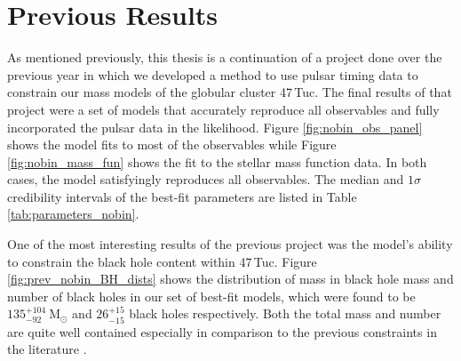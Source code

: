 


\section{Previous Results}

As mentioned previously, this thesis is a continuation of a project done over the previous year in
which we developed a method to use pulsar timing data to constrain our mass models of the globular
cluster 47\,Tuc. The final results of that project were a set of models that accurately reproduce
all observables and fully incorporated the pulsar data in the likelihood. Figure
\ref{fig:nobin_obs_panel} shows the model fits to most of the observables while Figure
\ref{fig:nobin_mass_fun} shows the fit to the stellar mass function data. In both cases, the model
satisfyingly reproduces all observables. The median and $1\sigma$ credibility intervals of the
best-fit parameters are listed in Table \ref{tab:parameters_nobin}.

One of the most interesting results of the previous project was the model's ability to constrain the
black hole content within 47\,Tuc. Figure \ref{fig:prev_nobin_BH_dists} shows the distribution of
mass in black hole mass and number of black holes in our set of best-fit models, which were found to
be $135^{+104}_{-92} \ \mathrm{M}_\odot$ and $26^{+15}_{-15}$ black holes respectively. Both the
total mass and number are quite well contained especially in comparison to the previous constraints
in the literature \citep[see e.g.][]{Henault-Brunet2020,Weatherford2019}.




